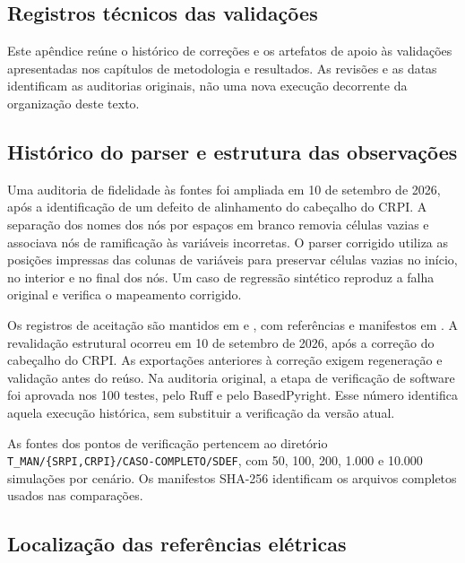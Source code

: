 \documentclass[
	12pt,				%
	openright,			%
	oneside,			%
	a4paper,			%
	chapter=TITLE,		%
	section=TITLE,		%
	subsection=TITLE,	%
	subsubsection=TITLE,%
	english,			%
	brazilian			%
	]{abntex2}
\theoremstyle{definition}
\begin{document}
\begin{apendicesenv}
\partapendices
\chapter{Registros técnicos das validações}
\label{app:validation-records}

Este apêndice reúne o histórico de correções e os artefatos de apoio às
validações apresentadas nos capítulos de metodologia e resultados. As
revisões e as datas identificam as auditorias originais, não uma nova
execução decorrente da organização deste texto.

\section{Histórico do parser e estrutura das observações}
\label{app:historico-parser}

Uma auditoria de fidelidade às fontes foi ampliada em 10 de setembro de 2026,
após a identificação de um defeito de alinhamento do cabeçalho do CRPI. A
separação dos nomes dos nós por espaços em branco removia células vazias e
associava nós de ramificação às variáveis incorretas. O parser corrigido utiliza
as posições impressas das colunas de variáveis para preservar células vazias no
início, no interior e no final dos nós. Um caso de regressão sintético
reproduz a falha original e verifica o mapeamento corrigido.

Os registros de aceitação são mantidos em
 e
, com referências e
manifestos em . A revalidação estrutural ocorreu em
10 de setembro de 2026, após a correção do cabeçalho do CRPI. As exportações
anteriores à correção exigem regeneração e validação antes do reúso.
Na auditoria original, a etapa de verificação de software foi aprovada nos
100 testes, pelo Ruff e pelo BasedPyright. Esse número identifica aquela
execução histórica, sem substituir a verificação da versão atual.

As fontes dos pontos de verificação pertencem ao diretório
\texttt{T\_MAN/\{SRPI,CRPI\}/CASO-COMPLETO/SDEF}, com 50, 100, 200,
1.000 e 10.000 simulações por cenário. Os manifestos SHA-256 identificam
os arquivos completos usados nas comparações.

\section{Localização das referências elétricas}
\label{app:fontes-eletricas}


\end{apendicesenv}
\end{document}
